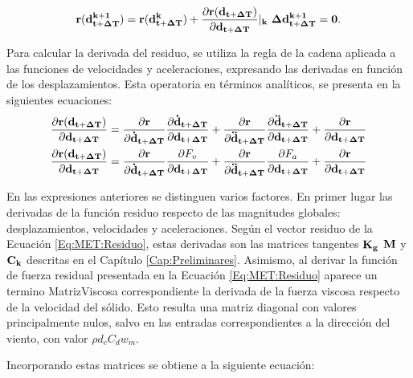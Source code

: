 \begin{equation}\label{Eq:MET:Residuo}
	\bf{r}(\bf{d}^{k+1}_{t+\Delta T})=\bf{r}(\bf{d}^k_{t+\Delta T}) +
	\frac{\partial  \bf{r}(\bf{d}_{t+\Delta T})}{\partial
		\bf{d}_{t+\Delta T}}|_k~\Delta \bf{d}^{k+1}_{t+\Delta T}=0.
\end{equation}

Para calcular la derivada del residuo, se utiliza la regla de la cadena aplicada a las funciones de velocidades y aceleraciones, expresando las derivadas en función de los desplazamientos. Esta operatoria en términos analíticos, se presenta en la siguientes ecuaciones: 
\begin{equation}\label{Eq:MET:DerivadaResiduo}
	\begin{split}
		\frac{\partial  \bf{r}(\bf{d}_{t+\Delta T})}{\partial
			\bf{d}_{t+\Delta T}}&=\frac{\partial  \bf{r}}{\partial
			\bf{\dot{d}}_{t+\Delta T}}\frac{\partial 
			\bf{\bf{\dot{d}}_{t+\Delta T}}}{\partial \bf{{d}}_{t+\Delta T}}+ \frac{\partial 
			\bf{r}}{\partial \bf{\ddot{d}}_{t+\Delta T}}\frac{\partial 
			\bf{\bf{\ddot{d}}_{t+\Delta T}}}{\partial \bf{{d}}_{t+\Delta T}}+\frac{\partial 
			\bf{r}}{\partial \bf{{d}}_{t+\Delta T}}\\
		\frac{\partial  \bf{r}(\bf{d}_{t+\Delta T})}{\partial \bf{d}_{t+\Delta T}}&= \frac{\partial  \bf{r}}{\partial\bf{\dot{d}}_{t+\Delta T}}\frac{\partial F_v}{\partial \bf{{d}}_{t+\Delta T}}+\frac{\partial  \bf{r}}{\partial\bf{\ddot{d}}_{t+\Delta T}}\frac{\partial F_a}{\partial \bf{{d}}_{t+\Delta T}}+\frac{\partial 
			\bf{r}}{\partial \bf{{d}}_{t+\Delta T}}
	\end{split}
\end{equation}

En las expresiones anteriores se distinguen varios factores. En primer lugar las derivadas de la función residuo respecto de las magnitudes globales: desplazamientos, velocidades y aceleraciones. Según el vector residuo de la Ecuación \eqref{Eq:MET:Residuo}, estas derivadas son las matrices tangentes $\bf{K_g}$ $\bf{M}$ y $\bf{C_k}$ descritas en el Capítulo \ref{Cap:Preliminares}. Asimismo, al derivar la función de fuerza residual presentada en la Ecuación \eqref{Eq:MET:Residuo} aparece un termino \gls{MatrizViscosa} correspondiente la derivada de la fuerza viscosa respecto de la velocidad del sólido. Esto resulta una matriz diagonal con valores principalmente nulos, salvo en las entradas correspondientes a la dirección del viento, con valor $\rho d_c C_d w_m$.

Incorporando estas matrices se obtiene a la siguiente ecuación:

